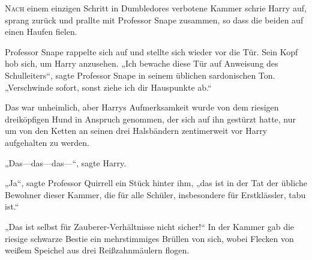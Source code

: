 
\lettrine{N}{ach} einem einzigen Schritt in Dumbledores verbotene Kammer schrie Harry auf, sprang zurück und prallte mit Professor Snape zusammen, so dass die beiden auf einen Haufen fielen.

Professor Snape rappelte sich auf und stellte sich wieder vor die Tür. Sein Kopf hob sich, um Harry anzusehen.
„Ich bewache diese Tür auf Anweisung des Schulleiters“, sagte Professor Snape in seinem üblichen sardonischen Ton. „Verschwinde sofort, sonst ziehe ich dir Hauspunkte ab.“

Das war unheimlich, aber Harrys Aufmerksamkeit wurde von dem riesigen dreiköpfigen Hund in Anspruch genommen, der sich auf ihn gestürzt hatte, nur um von den Ketten an seinen drei Halsbändern zentimerweit vor Harry aufgehalten zu werden.

„Das—das—das—“, sagte Harry.

„Ja“, sagte Professor Quirrell ein Stück hinter ihm, „das ist in der Tat der übliche Bewohner dieser Kammer, die für alle Schüler, insbesondere für Erstklässler, tabu ist.“

„Das ist selbst für Zauberer-Verhältnisse nicht sicher!“ In der Kammer gab die riesige schwarze Bestie ein mehrstimmiges Brüllen von sich, wobei Flecken von weißem Speichel aus drei Reißzahnmäulern flogen.

